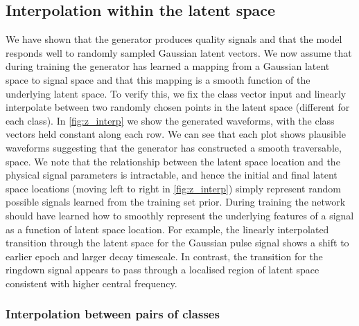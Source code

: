 \documentclass[12pt]{iopart}
\begin{document}
\subsection{Interpolation within the latent space}
%
%
 We have shown that the generator produces quality signals and that the model responds well to randomly sampled Gaussian latent vectors. We now assume that during training the generator has learned a mapping from a Gaussian latent space to signal space and that this mapping is a smooth function of the underlying latent space. To verify this, we fix the class vector input and linearly interpolate between two randomly chosen points in the latent space (different for each class). In \cref{fig:z_interp} we show the generated waveforms, with the class vectors held constant along each row. We can see that each plot shows plausible waveforms suggesting that the generator has constructed a smooth traversable, space. We note that the relationship between the latent space location and the physical signal parameters is intractable, and hence the initial and final latent space locations (moving left to right in \cref{fig:z_interp}) simply represent random possible signals learned from the training set prior. During training the network should have learned how to smoothly represent the underlying features of a signal as a function of latent space location. For example, the linearly interpolated transition through the latent space for the Gaussian pulse signal shows a shift to earlier epoch and larger decay timescale. In contrast, the transition for the ringdown signal appears to pass through a localised region of latent space consistent with higher central frequency. 
\subsubsection{Interpolation between pairs of classes}
\end{document}

